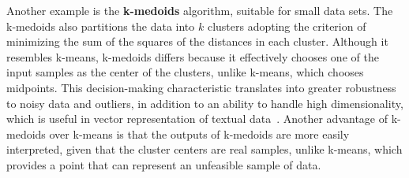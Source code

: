 \documentclass{ieeeaccess}
\begin{document}
Another example is the \textbf{k-medoids} algorithm, suitable for small data sets. The k-medoids also partitions the data into $ k $ clusters adopting the criterion of minimizing the sum of the squares of the distances in each cluster. Although it resembles k-means, k-medoids differs because it effectively chooses one of the input samples as the center of the clusters, unlike k-means, which chooses midpoints. This decision-making characteristic translates into greater robustness to noisy data and outliers, in addition to an ability to handle high dimensionality, which is useful in vector representation of textual data~\cite{xu2005survey, fahad2014survey}. Another advantage of k-medoids over k-means is that the outputs of k-medoids are more easily interpreted, given that the cluster centers are real samples, unlike k-means, which provides a point that can represent an unfeasible sample of data.

\end{document}
